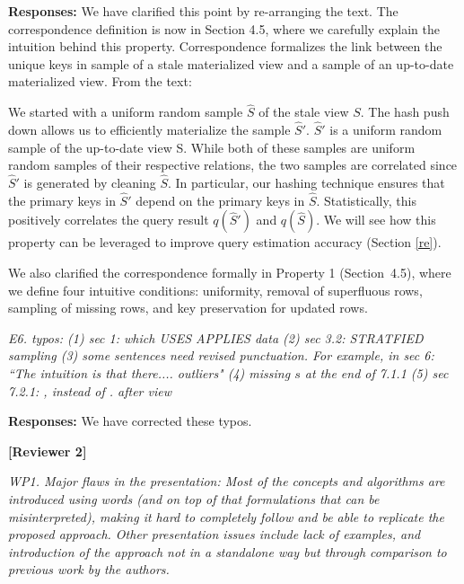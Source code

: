 \vspace{.25em}

{\bf Responses:} We have clarified this point by re-arranging the text. The correspondence definition is now in Section 4.5, where we carefully explain the intuition behind this property. Correspondence formalizes the link between the unique keys in sample of a stale materialized view and a sample of an up-to-date materialized view. From the text: \begin{displayquote} 
We started with a uniform random sample $\widehat{S}$ of the stale view $S$. The hash push down allows us to efficiently materialize the sample $\widehat{S}'$. $\widehat{S}'$ is a uniform random sample of the up-to-date view S. While both of these samples are uniform random samples of their respective relations, the two samples are correlated since $\widehat{S}'$ is generated by cleaning $\widehat{S}$. In particular, our hashing technique ensures that the primary keys in $\widehat{S}'$ depend on the primary keys in $\widehat{S}$. Statistically, this positively correlates the query result $q(\widehat{S}')$ and $q(\widehat{S})$. We will see how this property can be leveraged to improve query estimation accuracy (Section \ref{re}).\end{displayquote} 
We also clarified the correspondence formally in Property 1 (Section~4.5), where we define four intuitive conditions: uniformity, removal of superfluous rows, sampling of missing rows, and key preservation for updated rows.

\vspace{1em}
\emph{E6. typos:
(1) sec 1: which USES APPLIES data
(2) sec 3.2: STRATFIED sampling
(3) some sentences need revised punctuation. For example, in sec 6: ``The intuition is that there.... outliers"
(4) missing $s$ at the end of 7.1.1
(5) sec 7.2.1: , instead of . after view}

\vspace{.25em}

{\bf Responses:} We have corrected these typos.



\vspace{2em}
\noindent\textbf{[Reviewer 2]}

\vspace{1em}
\emph{WP1. Major flaws in the presentation: Most of the concepts and algorithms are introduced using words (and on top of that formulations that can be misinterpreted), making it hard to completely follow and be able to replicate the proposed approach. Other presentation issues include lack of examples, and introduction of the approach not in a standalone way but through comparison to previous work by the authors.}

